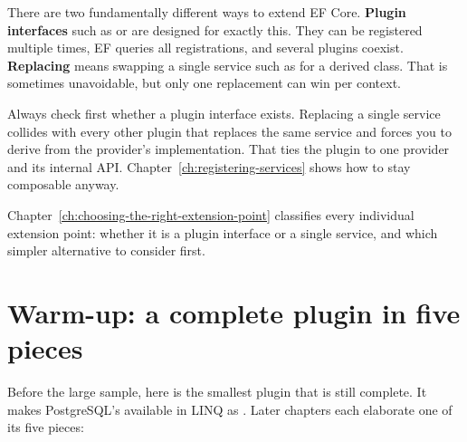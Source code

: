 There are two fundamentally different ways to extend EF Core. \textbf{Plugin interfaces}
such as  or
 are designed for exactly this. They
can be registered multiple times, EF queries all registrations, and several plugins coexist.
\textbf{Replacing} means swapping a single service such as
 for a derived class. That is
sometimes unavoidable, but only one replacement can win per context.

\begin{important}
  Always check first whether a plugin interface exists. Replacing a single service collides
  with every other plugin that replaces the same service and forces you to derive from the
  provider's implementation. That ties the plugin to one provider and its internal API.
  Chapter~\ref{ch:registering-services} shows how to stay composable anyway.
\end{important}

Chapter~\ref{ch:choosing-the-right-extension-point} classifies every individual extension
point: whether it is a plugin interface or a single service, and which simpler alternative to
consider first.

\section{Warm-up: a complete plugin in five pieces}

Before the large sample, here is the smallest plugin that is still complete. It makes
PostgreSQL's  available in LINQ as
.
Later chapters each elaborate one of its five pieces:


